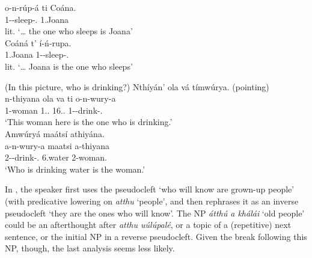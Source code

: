\documentclass[output=paper]{langscibook}
\begin{document}
\ea
\gll
o-n-rúp-á  ti  Coána.\\
    1\SM{}-\PRS{}-sleep-\FV.\REL{}  \COP{}  1.Joana\\
\glt
    lit. ‘… the one who sleeps is Joana’\\

\ex
\gll
Coáná  t’  í-ń-rupa.\\
1.Joana  \COP{}  1-\PRS{}-sleep-\FV.\REL{}\\
\glt
    lit. ‘… Joana is the one who sleeps’ \citep[261]{vanderWal2009a}\\

\z
\z

\ea
\label{bkm:Ref117584290}(In this picture, who is drinking?)
\ea
Nthíyán’ ola vá tímwúrya. (pointing)\\
\gll
n-thiyana  ola  va  ti  o-n-wury-a\\
1-woman  1.\DEM{}.\PROX{}  16.\DEM{}.\PROX{}  \COP{}  1-\PRS{}-drink-\FV{}.\REL{}\\
\glt
‘This woman here is the one who is drinking.’\\

\ex
Amwúryá maátsí athiyána.\\
\gll
a-n-wury-a  maatsi  a-thiyana\\
2-\PRS{}-drink-\FV{}.\REL{}  6.water  2-woman.\PRL{}\\
\glt
‘Who is drinking water is the woman.’\\


\z
\z

In , the speaker first uses the pseudocleft ‘who will know are grown-up people’ (with predicative lowering on \textit{atthu} ‘people’, and then rephrases it as an inverse pseudocleft ‘they are the ones who will know’. The NP \textit{átthú a khálái} ‘old people’ could be an afterthought after \textit{atthu uúlúpalé}, or a topic of a (repetitive) next sentence, or the initial NP in a reverse pseudocleft. Given the break following this NP, though, the last analysis seems less likely.\largerpage[-1]
\end{document}
